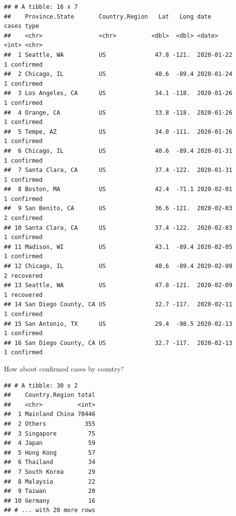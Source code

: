 \documentclass[]{book}
\newenvironment{Shaded}{\begin{snugshade}}{\end{snugshade}}
\newcommand{\DataTypeTok}[1]{\textcolor[rgb]{0.13,0.29,0.53}{#1}}
\newcommand{\KeywordTok}[1]{\textcolor[rgb]{0.13,0.29,0.53}{\textbf{#1}}}
\newcommand{\NormalTok}[1]{#1}
\newcommand{\OperatorTok}[1]{\textcolor[rgb]{0.81,0.36,0.00}{\textbf{#1}}}
\newcommand{\StringTok}[1]{\textcolor[rgb]{0.31,0.60,0.02}{#1}}
\begin{document}
\begin{verbatim}
## # A tibble: 16 x 7
##    Province.State       Country.Region   Lat   Long date       cases type     
##    <chr>                <chr>          <dbl>  <dbl> <date>     <int> <chr>    
##  1 Seattle, WA          US              47.8 -121.  2020-01-22     1 confirmed
##  2 Chicago, IL          US              40.6  -89.4 2020-01-24     1 confirmed
##  3 Los Angeles, CA      US              34.1 -118.  2020-01-26     1 confirmed
##  4 Orange, CA           US              33.8 -118.  2020-01-26     1 confirmed
##  5 Tempe, AZ            US              34.0 -111.  2020-01-26     1 confirmed
##  6 Chicago, IL          US              40.6  -89.4 2020-01-31     1 confirmed
##  7 Santa Clara, CA      US              37.4 -122.  2020-01-31     1 confirmed
##  8 Boston, MA           US              42.4  -71.1 2020-02-01     1 confirmed
##  9 San Benito, CA       US              36.6 -121.  2020-02-03     2 confirmed
## 10 Santa Clara, CA      US              37.4 -122.  2020-02-03     1 confirmed
## 11 Madison, WI          US              43.1  -89.4 2020-02-05     1 confirmed
## 12 Chicago, IL          US              40.6  -89.4 2020-02-09     2 recovered
## 13 Seattle, WA          US              47.8 -121.  2020-02-09     1 recovered
## 14 San Diego County, CA US              32.7 -117.  2020-02-11     1 confirmed
## 15 San Antonio, TX      US              29.4  -98.5 2020-02-13     1 confirmed
## 16 San Diego County, CA US              32.7 -117.  2020-02-13     1 confirmed
\end{verbatim}

How about confirmed cases by country?

\begin{Shaded}
\end{Shaded}

\begin{verbatim}
## # A tibble: 30 x 2
##    Country.Region total
##    <chr>          <int>
##  1 Mainland China 70446
##  2 Others           355
##  3 Singapore         75
##  4 Japan             59
##  5 Hong Kong         57
##  6 Thailand          34
##  7 South Korea       29
##  8 Malaysia          22
##  9 Taiwan            20
## 10 Germany           16
## # ... with 20 more rows
\end{verbatim}
\end{document}
